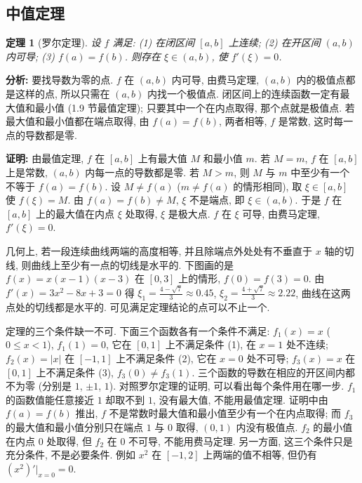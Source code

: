 \documentclass[UTF8,openany]{ctexbook}
\theoremstyle{chinesetextbook}
\newtheorem{theorem}{定理}[section]
\newenvironment{cnproof}{\par\indent\textbf{证明:} \ignorespaces}{\par}
\begin{document}
\subsection{中值定理}
\begin{theorem}[罗尔定理]\label{thm:c2-6-rolle}
设 $f$ 满足: (1) 在闭区间 $[a,b]$ 上连续; (2) 在开区间 $(a,b)$ 内可导; (3) $f(a)=f(b)$. 则存在 $\xi\in(a,b)$, 使 $f'(\xi)=0$.
\end{theorem}
\par\indent\textbf{分析:} 要找导数为零的点. $f$ 在 $(a,b)$ 内可导, 由费马定理, $(a,b)$ 内的极值点都是这样的点, 所以只需在 $(a,b)$ 内找一个极值点. 闭区间上的连续函数一定有最大值和最小值 (1.9 节最值定理); 只要其中一个在内点取得, 那个点就是极值点. 若最大值和最小值都在端点取得, 由 $f(a)=f(b)$, 两者相等, $f$ 是常数, 这时每一点的导数都是零.
\begin{cnproof}
由最值定理, $f$ 在 $[a,b]$ 上有最大值 $M$ 和最小值 $m$. 若 $M=m$, $f$ 在 $[a,b]$ 上是常数, $(a,b)$ 内每一点的导数都是零. 若 $M>m$, 则 $M$ 与 $m$ 中至少有一个不等于 $f(a)=f(b)$. 设 $M\ne f(a)$ ($m\ne f(a)$ 的情形相同), 取 $\xi\in[a,b]$ 使 $f(\xi)=M$. 由 $f(a)=f(b)\ne M$, $\xi$ 不是端点, 即 $\xi\in(a,b)$. 于是 $f$ 在 $[a,b]$ 上的最大值在内点 $\xi$ 处取得, $\xi$ 是极大点. $f$ 在 $\xi$ 可导, 由费马定理, $f'(\xi)=0$.
\end{cnproof}
几何上, 若一段连续曲线两端的高度相等, 并且除端点外处处有不垂直于 $x$ 轴的切线, 则曲线上至少有一点的切线是水平的. 下图画的是 $f(x)=x(x-1)(x-3)$ 在 $[0,3]$ 上的情形, $f(0)=f(3)=0$. 由 $f'(x)=3x^2-8x+3=0$ 得 $\displaystyle\xi_1=\frac{4-\sqrt7}3\approx0.45$, $\displaystyle\xi_2=\frac{4+\sqrt7}3\approx2.22$, 曲线在这两点处的切线都是水平的. 可见满足定理结论的点可以不止一个.
\begin{center}
\end{center}

定理的三个条件缺一不可. 下面三个函数各有一个条件不满足: $f_1(x)=x$ ($0\le x<1$), $f_1(1)=0$, 它在 $[0,1]$ 上不满足条件 (1), 在 $x=1$ 处不连续; $f_2(x)=|x|$ 在 $[-1,1]$ 上不满足条件 (2), 它在 $x=0$ 处不可导; $f_3(x)=x$ 在 $[0,1]$ 上不满足条件 (3), $f_3(0)\ne f_3(1)$. 三个函数的导数在相应的开区间内都不为零 (分别是 $1$, $\pm1$, $1$). 对照罗尔定理的证明, 可以看出每个条件用在哪一步. $f_1$ 的函数值能任意接近 $1$ 却取不到 $1$, 没有最大值, 不能用最值定理. 证明中由 $f(a)=f(b)$ 推出, $f$ 不是常数时最大值和最小值至少有一个在内点取得; 而 $f_3$ 的最大值和最小值分别只在端点 $1$ 与 $0$ 取得, $(0,1)$ 内没有极值点. $f_2$ 的最小值在内点 $0$ 处取得, 但 $f_2$ 在 $0$ 不可导, 不能用费马定理. 另一方面, 这三个条件只是充分条件, 不是必要条件. 例如 $x^2$ 在 $[-1,2]$ 上两端的值不相等, 但仍有 $(x^2)'\big|_{x=0}=0$.
\end{document}

